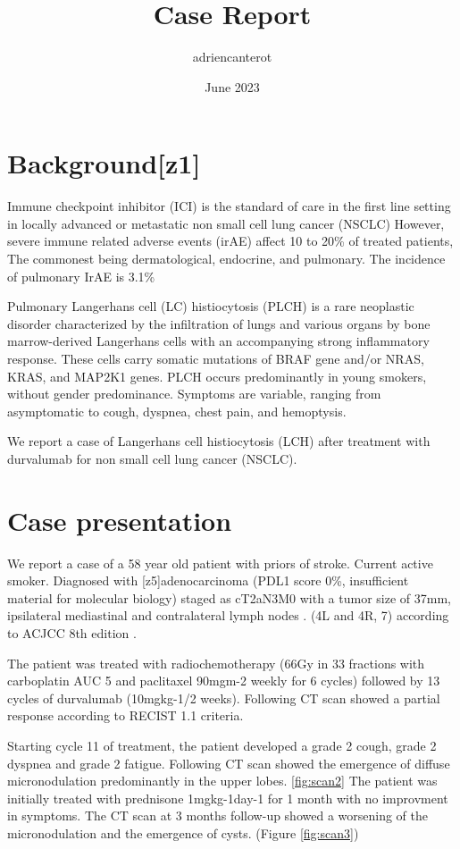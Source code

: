 \documentclass{article}
\title{Case Report}
\author{adriencanterot}
\date{June 2023}
\begin{document}
\maketitle

\section{Background[z1]}
Immune checkpoint inhibitor (ICI) is the standard of care in the first line setting in locally advanced or metastatic non small cell lung cancer (NSCLC) 
However, severe immune related adverse events (irAE) affect 10 to 20\% of treated patients, The commonest being dermatological, endocrine, and pulmonary. The incidence of pulmonary IrAE is 3.1\% \cite{ramos-casals_immune-related_2020}

Pulmonary Langerhans cell (LC) histiocytosis (PLCH) is a rare neoplastic disorder characterized by the infiltration of lungs and various organs by bone marrow-derived Langerhans cells with an accompanying strong inflammatory response. These cells carry somatic mutations of BRAF gene and/or NRAS, KRAS, and MAP2K1 genes. PLCH occurs predominantly in young smokers, without gender predominance. \cite{radzikowska_update_2021}
Symptoms are variable, ranging from asymptomatic to cough, dyspnea, chest pain, and hemoptysis.

We report a case of Langerhans cell histiocytosis (LCH) after treatment with durvalumab for non small cell lung cancer (NSCLC).

\section{Case presentation}
We report a case of a 58 year old patient with priors of stroke. Current active smoker.
Diagnosed with [z5]adenocarcinoma (PDL1 score 0\%, insufficient material for molecular biology) staged as cT2aN3M0 with a tumor size of 37mm, ipsilateral mediastinal and contralateral lymph nodes . (4L and 4R, 7) according to ACJCC 8th edition \cite{goldstraw_iaslc_2016}.

The patient was treated with radiochemotherapy (66Gy in 33 fractions with carboplatin AUC 5 and paclitaxel 90mg\/m-2 weekly for 6 cycles) followed by 13 cycles of durvalumab (10mg\/kg-1/2 weeks). Following CT scan showed a partial response according to RECIST 1.1 criteria.

Starting cycle 11 of treatment, the patient developed a grade 2 cough, grade 2 dyspnea and grade 2 fatigue. Following CT scan showed the emergence of diffuse micronodulation predominantly in the upper lobes. \ref{fig:scan2}
The patient was initially treated with prednisone 1mgkg-1day-1 for 1 month with no improvment in symptoms. \cite{lazor_cryptogenic_2000}
The CT scan at 3 months follow-up showed a worsening of the micronodulation and the emergence of cysts. (Figure \ref{fig:scan3})
\end{document}
